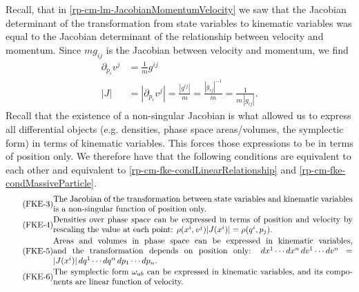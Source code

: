 Recall, that in \ref{rp-cm-lm-JacobianMomentumVelocity} we saw that the Jacobian determinant of the transformation from state variables to kinematic variables was equal to the Jacobian determinant of the relationship between velocity and momentum. Since $m g_{ij}$ is the Jacobian between velocity and momentum, we find
\begin{equation}\label{rp-cm-fke-metricTensorDeterminantIsJacobianForDensities}
	\begin{aligned}
		\partial_{p_i} v^j &= \frac{1}{m}g^{ij} \\
		|J| &= |\partial_{p_i} v^j | = \frac{|g^{ij}|}{m} = \frac{|g_{ij}|^{-1}}{m} = \frac{1}{m \,|g_{ij}|}. 
	\end{aligned}
\end{equation}
Recall that the existence of a non-singular Jacobian is what allowed us to express all differential objects (e.g. densities, phase space areas/volumes, the symplectic form) in terms of kinematic variables. This forces those expressions to be in terms of position only. We therefore have that the following conditions are equivalent to each other and equivalent to \ref{rp-cm-fke-condLinearRelationship} and \ref{rp-cm-fke-condMassiveParticle}.
\begin{align}
	\tag{FKE-3}\label{rp-cm-fke-condJacobianOfPosition}
	&\parbox{5in}{The Jacobian of the transformation between state variables and kinematic variables is a non-singular function of position only.} \\
	\tag{FKE-4}\label{rp-cm-fke-condDensitiesOfPosition}
	&\parbox{5in}{Densities over phase space can be expressed in terms of position and velocity by rescaling the value at each point: $\rho(x^i, v^j) |J(x^i)| = \rho(q^i, p_j)$.} \\
	\tag{FKE-5}\label{rp-cm-fke-condAreasOfPosition}
	&\parbox{5in}{Areas and volumes in phase space can be expressed in kinematic variables, and the transformation depends on position only: $dx^1 \cdots dx^n \, dv^1 \cdots dv^n = |J(x^i)| \, dq^1 \cdots dq^n \, dp_1 \cdots dp_n$.} \\
	\tag{FKE-6}\label{rp-cm-fke-condSymplecticOfPosition}
	&\parbox{5in}{The symplectic form $\omega_{ab}$ can be expressed in kinematic variables, and its components are linear function of velocity.}
\end{align}

